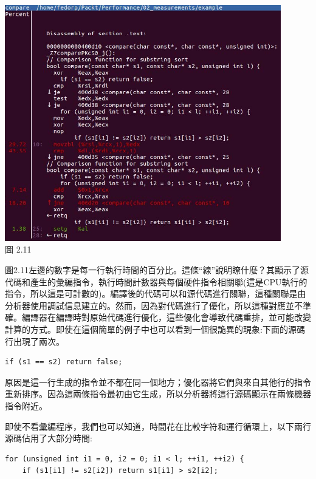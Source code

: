 \begin{center}
\includegraphics[width=0.9\textwidth]{content/1/chapter2/images/11.jpg}\\
圖 2.11
\end{center}

圖2.11左邊的數字是每一行執行時間的百分比。這條“線”說明瞭什麼？其顯示了源代碼和產生的彙編指令，執行時間計數器與每個硬件指令相關聯(這是CPU執行的指令，所以這是可計數的)。編譯後的代碼可以和源代碼進行關聯，這種關聯是由分析器使用調試信息建立的。然而，因為對代碼進行了優化，所以這種對應並不準確。編譯器在編譯時對原始代碼進行優化，這些優化會導致代碼重排，並可能改變計算的方式。即使在這個簡單的例子中也可以看到一個很詭異的現象:下面的源碼行出現了兩次。

\begin{lstlisting}[style=styleCXX]
if (s1 == s2) return false;
\end{lstlisting}

原因是這一行生成的指令並不都在同一個地方；優化器將它們與來自其他行的指令重新排序。因為這兩條指令最初由它生成，所以分析器將這行源碼顯示在兩條機器指令附近。

即使不看彙編程序，我們也可以知道，時間花在比較字符和運行循環上，以下兩行源碼佔用了大部分時間:

\begin{lstlisting}[style=styleCXX]
for (unsigned int i1 = 0, i2 = 0; i1 < l; ++i1, ++i2) {
	if (s1[i1] != s2[i2]) return s1[i1] > s2[i2];
\end{lstlisting}

